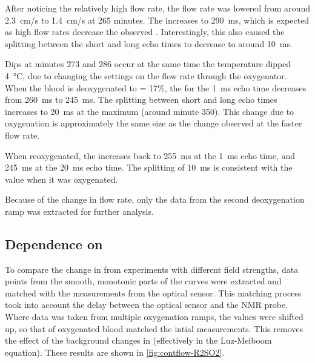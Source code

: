 After noticing the relatively high flow rate, the flow rate was lowered from around \SI{2.3}{cm/s} to \SI{1.4}{cm/s} at 265 minutes.
The \Ttwo increases to \SI{290}{ms}, which is expected as high flow rates decrease the observed \Ttwo.
Interestingly, this also caused the splitting between the short and long echo times to decrease to around \SI{10}{ms}.

Dips at minutes 273 and 286 occur at the same time the temperature dipped \SI{4}{\celsius}, due to changing the settings on the flow rate through the oxygenator.
When the blood is deoxygenated to \SOtwo = 17\%,  the \Ttwo for the \SI{1}{ms} echo time decreases from \SI{260}{ms} to \SI{245}{ms}.
The splitting between short and long echo times increases to \SI{20}{ms} at the maximum (around minute 350).
This \Ttwo change due to oxygenation is approximately the same size as the change observed at the faster flow rate.

When reoxygenated, the \Ttwo increases back to \SI{255}{ms} at the \SI{1}{ms} echo time, and \SI{245}{ms} at the \SI{20}{ms} echo time.
The splitting of \SI{10}{ms} is consistent with the value when it was oxygenated.

Because of the change in flow rate, only the data from the second deoxygenation ramp was extracted for further analysis.

\subsection{Dependence on \SOtwo}
\label{contflow:fieldcomp}
To compare the change in \Ttwo from experiments with different field strengths, data points from the smooth, monotonic parts of the \Ttwo curves were extracted and matched with the \SOtwo measurements from the optical sensor.
This matching process took into account the delay between the optical sensor and the NMR probe.
Where data was taken from multiple oxygenation ramps, the \Ttwo values were shifted up, so that \Ttwo of oxygenated blood matched the intial measurements.
This removes the effect of the background changes in \Ttwo (effectively \TtwoO in the Luz-Meiboom equation).
These results are shown in \autoref{fig:contflow-R2SO2}.

